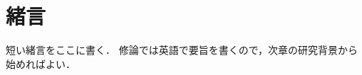 \chapter{緒言}
\label{chap:Introdunction}

短い緒言をここに書く．
修論では英語で要旨を書くので，次章の研究背景から始めればよい．

\textcolor{LightGray}{
}
